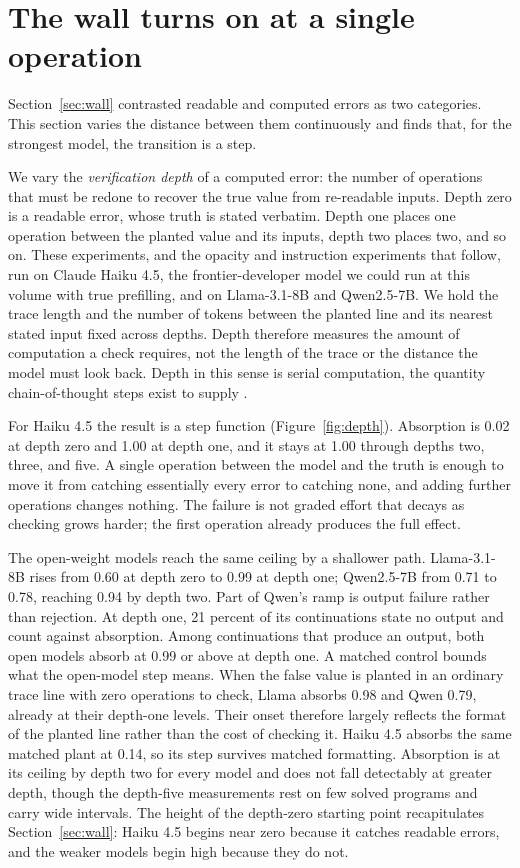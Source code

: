 \section{The wall turns on at a single operation}
\label{sec:depth}

Section~\ref{sec:wall} contrasted readable and computed errors as two categories. This section varies the distance between them continuously and finds that, for the strongest model, the transition is a step.

We vary the \emph{verification depth} of a computed error: the number of operations that must be redone to recover the true value from re-readable inputs. Depth zero is a readable error, whose truth is stated verbatim. Depth one places one operation between the planted value and its inputs, depth two places two, and so on. These experiments, and the opacity and instruction experiments that follow, run on Claude Haiku 4.5, the frontier-developer model we could run at this volume with true prefilling, and on Llama-3.1-8B and Qwen2.5-7B. We hold the trace length and the number of tokens between the planted line and its nearest stated input fixed across depths. Depth therefore measures the amount of computation a check requires, not the length of the trace or the distance the model must look back. Depth in this sense is serial computation, the quantity chain-of-thought steps exist to supply \citep{merrill2024expressive,feng2023towards}.

For Haiku 4.5 the result is a step function (Figure~\ref{fig:depth}). Absorption is 0.02 at depth zero and 1.00 at depth one, and it stays at 1.00 through depths two, three, and five. A single operation between the model and the truth is enough to move it from catching essentially every error to catching none, and adding further operations changes nothing. The failure is not graded effort that decays as checking grows harder; the first operation already produces the full effect.

The open-weight models reach the same ceiling by a shallower path. Llama-3.1-8B rises from 0.60 at depth zero to 0.99 at depth one; Qwen2.5-7B from 0.71 to 0.78, reaching 0.94 by depth two. Part of Qwen's ramp is output failure rather than rejection. At depth one, 21 percent of its continuations state no output and count against absorption. Among continuations that produce an output, both open models absorb at 0.99 or above at depth one. A matched control bounds what the open-model step means. When the false value is planted in an ordinary trace line with zero operations to check, Llama absorbs 0.98 and Qwen 0.79, already at their depth-one levels. Their onset therefore largely reflects the format of the planted line rather than the cost of checking it. Haiku 4.5 absorbs the same matched plant at 0.14, so its step survives matched formatting. Absorption is at its ceiling by depth two for every model and does not fall detectably at greater depth, though the depth-five measurements rest on few solved programs and carry wide intervals. The height of the depth-zero starting point recapitulates Section~\ref{sec:wall}: Haiku 4.5 begins near zero because it catches readable errors, and the weaker models begin high because they do not.
